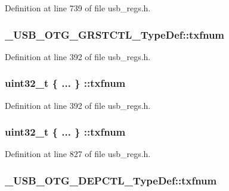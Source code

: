Definition at line 739 of file usb\-\_\-regs.\-h.

\hypertarget{group___u_s_b___o_t_g___d_r_i_v_e_r_gab95417d18c00e88b30adcc7641257683}{
\subsubsection[{txfnum}]{ \-\_\-\-U\-S\-B\-\_\-\-O\-T\-G\-\_\-\-G\-R\-S\-T\-C\-T\-L\-\_\-\-Type\-Def\-::txfnum}}\label{group___u_s_b___o_t_g___d_r_i_v_e_r_gab95417d18c00e88b30adcc7641257683}


Definition at line 392 of file usb\-\_\-regs.\-h.

\hypertarget{group___u_s_b___o_t_g___d_r_i_v_e_r_ga718a242ec0ef9927b58ed51098da9108}{
\subsubsection[{txfnum}]{\setlength{\rightskip}{0pt plus 5cm}uint32\-\_\-t \{ ... \} \-::txfnum}}\label{group___u_s_b___o_t_g___d_r_i_v_e_r_ga718a242ec0ef9927b58ed51098da9108}


Definition at line 392 of file usb\-\_\-regs.\-h.

\hypertarget{group___u_s_b___o_t_g___d_r_i_v_e_r_ga737409f59d10bf605431a95cbdd5d709}{
\subsubsection[{txfnum}]{\setlength{\rightskip}{0pt plus 5cm}uint32\-\_\-t \{ ... \} \-::txfnum}}\label{group___u_s_b___o_t_g___d_r_i_v_e_r_ga737409f59d10bf605431a95cbdd5d709}


Definition at line 827 of file usb\-\_\-regs.\-h.

\hypertarget{group___u_s_b___o_t_g___d_r_i_v_e_r_ga44558e437642307114827cdb9ca99c90}{
\subsubsection[{txfnum}]{ \-\_\-\-U\-S\-B\-\_\-\-O\-T\-G\-\_\-\-D\-E\-P\-C\-T\-L\-\_\-\-Type\-Def\-::txfnum}}\label{group___u_s_b___o_t_g___d_r_i_v_e_r_ga44558e437642307114827cdb9ca99c90}


